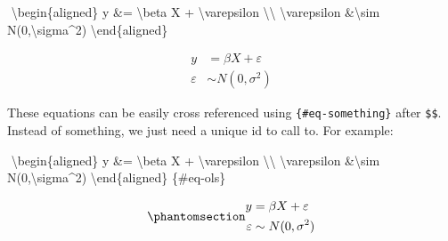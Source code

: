 \documentclass[
  12pt,
]{article}
\newenvironment{Shaded}{\begin{snugshade}}{\end{snugshade}}
\newcommand{\ExtensionTok}[1]{\textcolor[rgb]{0.00,0.23,0.31}{#1}}
\newcommand{\KeywordTok}[1]{\textcolor[rgb]{0.00,0.23,0.31}{#1}}
\newcommand{\NormalTok}[1]{\textcolor[rgb]{0.00,0.23,0.31}{#1}}
\newcommand{\SpecialCharTok}[1]{\textcolor[rgb]{0.37,0.37,0.37}{#1}}
\newcommand{\SpecialStringTok}[1]{\textcolor[rgb]{0.13,0.47,0.30}{#1}}
\begin{document}
\begin{Shaded}
\begin{Highlighting}[]
\SpecialStringTok{$$}
\KeywordTok{\textbackslash{}begin}\NormalTok{\{}\ExtensionTok{aligned}\NormalTok{\}}
\SpecialStringTok{y \&= }\SpecialCharTok{\textbackslash{}beta}\SpecialStringTok{ X + }\SpecialCharTok{\textbackslash{}varepsilon}\SpecialStringTok{ }\SpecialCharTok{\textbackslash{}\textbackslash{}}
\SpecialCharTok{\textbackslash{}varepsilon}\SpecialStringTok{ \&}\SpecialCharTok{\textbackslash{}sim}\SpecialStringTok{ N(0,}\SpecialCharTok{\textbackslash{}sigma}\SpecialStringTok{\^{}2)}
\KeywordTok{\textbackslash{}end}\NormalTok{\{}\ExtensionTok{aligned}\NormalTok{\}}
\SpecialStringTok{$$}
\end{Highlighting}
\end{Shaded}

\[
\begin{aligned}
y &= \beta X + \varepsilon \\
\varepsilon &\sim N(0,\sigma^2)
\end{aligned}
\]

These equations can be easily cross referenced using
\texttt{\{\#eq-something\}} after \texttt{\$\$}. Instead of something,
we just need a unique id to call to. For example:

\begin{Shaded}
\begin{Highlighting}[]
\SpecialStringTok{$$}
\KeywordTok{\textbackslash{}begin}\NormalTok{\{}\ExtensionTok{aligned}\NormalTok{\}}
\SpecialStringTok{y \&= }\SpecialCharTok{\textbackslash{}beta}\SpecialStringTok{ X + }\SpecialCharTok{\textbackslash{}varepsilon}\SpecialStringTok{ }\SpecialCharTok{\textbackslash{}\textbackslash{}}
\SpecialCharTok{\textbackslash{}varepsilon}\SpecialStringTok{ \&}\SpecialCharTok{\textbackslash{}sim}\SpecialStringTok{ N(0,}\SpecialCharTok{\textbackslash{}sigma}\SpecialStringTok{\^{}2)}
\KeywordTok{\textbackslash{}end}\NormalTok{\{}\ExtensionTok{aligned}\NormalTok{\}}
\SpecialStringTok{$$}\NormalTok{\{\#eq{-}ols\}}
\end{Highlighting}
\end{Shaded}

\begin{equation}\phantomsection\label{eq-ols}{
\begin{aligned}
y &= \beta X + \varepsilon \\
\varepsilon &\sim N(0,\sigma^2)
\end{aligned}
}\end{equation}
\end{document}
